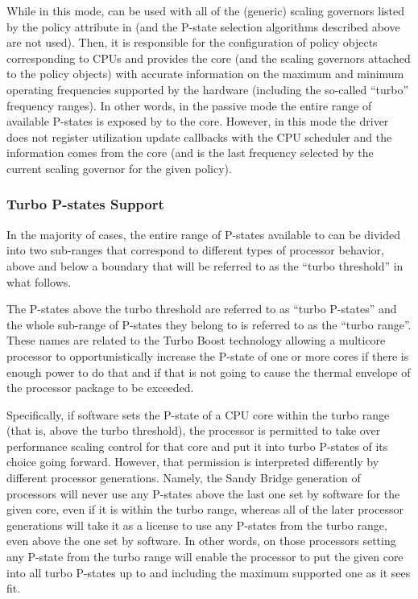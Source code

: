 \documentclass[a4paper,8pt,english]{sphinxmanual}
\begin{document}
While in this mode,  can be used with all of the (generic)
scaling governors listed by the  policy attribute
in  (and the P-state selection algorithms described above are not
used).  Then, it is responsible for the configuration of policy objects
corresponding to CPUs and provides the  core (and the scaling
governors attached to the policy objects) with accurate information on the
maximum and minimum operating frequencies supported by the hardware (including
the so-called ``turbo'' frequency ranges).  In other words, in the passive mode
the entire range of available P-states is exposed by  to the
 core.  However, in this mode the driver does not register
utilization update callbacks with the CPU scheduler and the 
information comes from the  core (and is the last frequency selected
by the current scaling governor for the given policy).


\subsubsection{Turbo P-states Support}
\label{admin-guide/pm/intel_pstate:turbo}\label{admin-guide/pm/intel_pstate:turbo-p-states-support}
In the majority of cases, the entire range of P-states available to
 can be divided into two sub-ranges that correspond to
different types of processor behavior, above and below a boundary that
will be referred to as the ``turbo threshold'' in what follows.

The P-states above the turbo threshold are referred to as ``turbo P-states'' and
the whole sub-range of P-states they belong to is referred to as the ``turbo
range''.  These names are related to the Turbo Boost technology allowing a
multicore processor to opportunistically increase the P-state of one or more
cores if there is enough power to do that and if that is not going to cause the
thermal envelope of the processor package to be exceeded.

Specifically, if software sets the P-state of a CPU core within the turbo range
(that is, above the turbo threshold), the processor is permitted to take over
performance scaling control for that core and put it into turbo P-states of its
choice going forward.  However, that permission is interpreted differently by
different processor generations.  Namely, the Sandy Bridge generation of
processors will never use any P-states above the last one set by software for
the given core, even if it is within the turbo range, whereas all of the later
processor generations will take it as a license to use any P-states from the
turbo range, even above the one set by software.  In other words, on those
processors setting any P-state from the turbo range will enable the processor
to put the given core into all turbo P-states up to and including the maximum
supported one as it sees fit.
\end{document}
